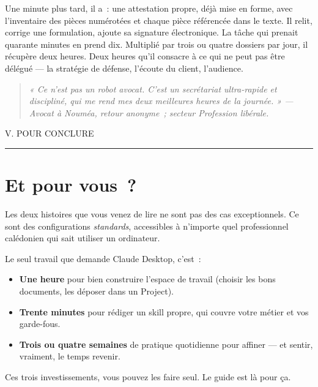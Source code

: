 \documentclass[11pt,a4paper]{article}
\newcommand{\dateline}[1]{{\footnotesize\ttfamily\color{encrefaint}\MakeUppercase{#1}}}
\newcommand{\pullquote}[1]{%
  \begin{quote}\itshape\color{encre}\large #1\end{quote}%
}
\begin{document}
Une minute plus tard, il a~: une attestation propre, déjà mise en forme,
avec l'inventaire des pièces numérotées et chaque pièce référencée dans
le texte. Il relit, corrige une formulation, ajoute sa signature
électronique. La tâche qui prenait quarante minutes en prend dix.
Multiplié par trois ou quatre dossiers par jour, il récupère deux heures.
Deux heures qu'il consacre à ce qui ne peut pas être délégué — la
stratégie de défense, l'écoute du client, l'audience.

\pullquote{« Ce n'est pas un robot avocat. C'est un secrétariat ultra-rapide
et discipliné, qui me rend mes deux meilleures heures de la journée. »
\footnotesize\rmfamily\color{encrefaint} — Avocat à Nouméa, retour anonyme~;
secteur Profession libérale.}

\newpage


\dateline{V. \quad Pour conclure}

\vspace{0.4cm}
{\color{encre}\rule{\linewidth}{0.4pt}}
\vspace{1cm}

\section*{Et pour vous~?}

Les deux histoires que vous venez de lire ne sont pas des cas exceptionnels.
Ce sont des configurations \textit{standards}, accessibles à n'importe quel
professionnel calédonien qui sait utiliser un ordinateur.

Le seul travail que demande Claude Desktop, c'est~:

\begin{itemize}
  \item \textbf{Une heure} pour bien construire l'espace de travail
        (choisir les bons documents, les déposer dans un Project).
  \item \textbf{Trente minutes} pour rédiger un skill propre, qui couvre
        votre métier et vos garde-fous.
  \item \textbf{Trois ou quatre semaines} de pratique quotidienne pour
        affiner — et sentir, vraiment, le temps revenir.
\end{itemize}

Ces trois investissements, vous pouvez les faire seul. Le guide est là
pour ça.
\end{document}
